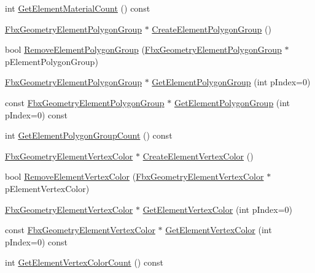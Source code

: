 \begin{DoxyCompactItemize}
\item 
int \hyperlink{class_fbx_geometry_base_a443797935c203b51edb4004907613017}{Get\+Element\+Material\+Count} () const
\item 
\hyperlink{fbxlayer_8h_aa5c7fb92a1c396014bf2ced7797a95a9}{Fbx\+Geometry\+Element\+Polygon\+Group} $\ast$ \hyperlink{class_fbx_geometry_base_a94ad7ac87ced572287ee85460304eb09}{Create\+Element\+Polygon\+Group} ()
\item 
bool \hyperlink{class_fbx_geometry_base_a0746664cececc19040a011ddbc7c7623}{Remove\+Element\+Polygon\+Group} (\hyperlink{fbxlayer_8h_aa5c7fb92a1c396014bf2ced7797a95a9}{Fbx\+Geometry\+Element\+Polygon\+Group} $\ast$p\+Element\+Polygon\+Group)
\item 
\hyperlink{fbxlayer_8h_aa5c7fb92a1c396014bf2ced7797a95a9}{Fbx\+Geometry\+Element\+Polygon\+Group} $\ast$ \hyperlink{class_fbx_geometry_base_ae54cbd4165026b82500d776a21e81e32}{Get\+Element\+Polygon\+Group} (int p\+Index=0)
\item 
const \hyperlink{fbxlayer_8h_aa5c7fb92a1c396014bf2ced7797a95a9}{Fbx\+Geometry\+Element\+Polygon\+Group} $\ast$ \hyperlink{class_fbx_geometry_base_a11838aa5259cb37a3024a9eb654b705c}{Get\+Element\+Polygon\+Group} (int p\+Index=0) const
\item 
int \hyperlink{class_fbx_geometry_base_a138cf34dd7162a7984a3317d0d4ff03b}{Get\+Element\+Polygon\+Group\+Count} () const
\item 
\hyperlink{fbxlayer_8h_a4baddeaf720350758d230973d114f593}{Fbx\+Geometry\+Element\+Vertex\+Color} $\ast$ \hyperlink{class_fbx_geometry_base_a866f39f540f6bc9ca8e529f27d9ebee4}{Create\+Element\+Vertex\+Color} ()
\item 
bool \hyperlink{class_fbx_geometry_base_a123d97fbece214d31199a63c90eb44e1}{Remove\+Element\+Vertex\+Color} (\hyperlink{fbxlayer_8h_a4baddeaf720350758d230973d114f593}{Fbx\+Geometry\+Element\+Vertex\+Color} $\ast$p\+Element\+Vertex\+Color)
\item 
\hyperlink{fbxlayer_8h_a4baddeaf720350758d230973d114f593}{Fbx\+Geometry\+Element\+Vertex\+Color} $\ast$ \hyperlink{class_fbx_geometry_base_a1b93a0dc9da34d479e5535d7d589fe0b}{Get\+Element\+Vertex\+Color} (int p\+Index=0)
\item 
const \hyperlink{fbxlayer_8h_a4baddeaf720350758d230973d114f593}{Fbx\+Geometry\+Element\+Vertex\+Color} $\ast$ \hyperlink{class_fbx_geometry_base_ac4748b1ed1007746aa7acf2f4c300d9f}{Get\+Element\+Vertex\+Color} (int p\+Index=0) const
\item 
int \hyperlink{class_fbx_geometry_base_ab0c36aa02e726e017f02802a42705f68}{Get\+Element\+Vertex\+Color\+Count} () const

\end{DoxyCompactItemize}
